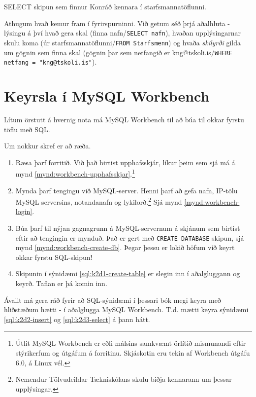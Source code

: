 \begin{example}[h]
\caption{SELECT skipun sem finnur Konráð kennara í starfsmannatöflunni.}
\label{sql:k2d3-select}
\centering
{}
\end{example}

Athugum hvað kemur fram í fyrirspurninni. Við getum séð þrjá aðalhluta - lýsingu á því hvað gera skal (finna nafn/\verb|SELECT nafn|), hvaðan upplýsingarnar skulu koma (úr starfsmannatöflunni/\verb|FROM Starfsmenn|) og hvaða \emph{skilyrði} gilda um gögnin sem finna skal (gögnin þar sem netfangið er kng@tskoli.is/\verb|WHERE netfang = "kng@tskoli.is"|). 

\section{Keyrsla í MySQL Workbench}
\label{undirkafli:keyrsla-i-workbench}
Lítum örstutt á hvernig nota má MySQL Workbench til að búa til okkar fyrstu töflu með SQL.

Um nokkur skref er að ræða.
\begin{enumerate}
 \item Ræsa þarf forritið. Við það birtist upphafsskjár, líkur þeim sem sjá má á mynd \ref{mynd:workbench-upphafsskjar}.\footnote{Útlit MySQL Workbench er eðli málsins samkvæmt örlítið mismunandi eftir stýrikerfum og útgáfum á forritinu. Skjáskotin eru tekin af Workbench útgáfu 6.0, á Linux vél.}
 \item Mynda þarf tengingu við MySQL-server. Henni þarf að gefa nafn, IP-tölu MySQL serversins, notandanafn og lykilorð.\footnote{Nemendur Tölvudeildar Tækniskólans skulu biðja kennarann um þessar upplýsingar.} Sjá mynd \ref{mynd:workbench-login}.
 \item Búa þarf til nýjan gagnagrunn á MySQL-servernum á skjánum sem birtist eftir að tengingin er mynduð. Það er gert með \verb|CREATE DATABASE| skipun, sjá mynd \ref{mynd:workbench-create-db}. Þegar þessu er lokið höfum við keyrt okkar fyrstu SQL-skipun!
 \item Skipunin í sýnidæmi \ref{sql:k2d1-create-table} er slegin inn í aðalgluggann og keyrð. Taflan er þá komin inn.
\end{enumerate}
Ávallt má gera ráð fyrir að SQL-sýnidæmi í þessari bók megi keyra með hliðstæðum hætti - í aðalglugga MySQL Workbench. T.d. mætti keyra sýnidæmi \ref{sql:k2d2-insert} og \ref{sql:k2d3-select} á þann hátt.

